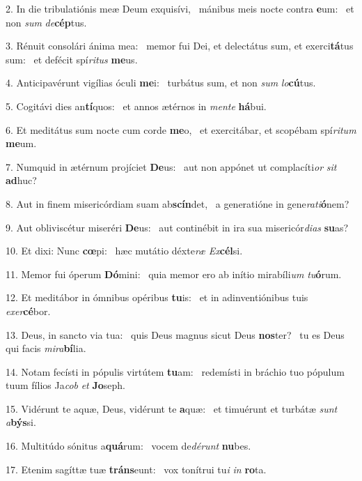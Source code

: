 2. In die tribulatiónis meæ Deum exquisívi, \dag\  mánibus meis nocte contra \textbf{e}um: \ast\  et non \textit{sum} \textit{de}\textbf{cép}tus.\

3. Rénuit consolári ánima mea: \dag\  memor fui Dei, et delectátus sum, et exerci\textbf{tá}tus sum: \ast\  et defécit spí\textit{ri}\textit{tus} \textbf{me}us.\

4. Anticipavérunt vigílias óculi \textbf{me}i: \ast\  turbátus sum, et non \textit{sum} \textit{lo}\textbf{cú}tus.\

5. Cogitávi dies an\textbf{tí}quos: \ast\  et annos ætérnos in \textit{men}\textit{te} \textbf{há}bui.\

6. Et meditátus sum nocte cum corde \textbf{me}o, \ast\  et exercitábar, et scopébam spí\textit{ri}\textit{tum} \textbf{me}um.\

7. Numquid in ætérnum projíciet \textbf{De}us: \ast\  aut non appónet ut complacíti\textit{or} \textit{sit} \textbf{ad}huc?\

8. Aut in finem misericórdiam suam ab\textbf{scín}det, \ast\  a generatióne in gene\textit{ra}\textit{ti}\textbf{ó}nem?\

9. Aut obliviscétur miseréri \textbf{De}us: \ast\  aut continébit in ira sua misericór\textit{di}\textit{as} \textbf{su}as?\

10. Et dixi: Nunc \textbf{cœ}pi: \ast\  hæc mutátio déxte\textit{ræ} \textit{Ex}\textbf{cél}si.\

11. Memor fui óperum \textbf{Dó}mini: \ast\  quia memor ero ab inítio mirabíli\textit{um} \textit{tu}\textbf{ó}rum.\

12. Et meditábor in ómnibus opéribus \textbf{tu}is: \ast\  et in adinventiónibus tuis \textit{ex}\textit{er}\textbf{cé}bor.\

13. Deus, in sancto via tua: \dag\  quis Deus magnus sicut Deus \textbf{nos}ter? \ast\  tu es Deus qui facis \textit{mi}\textit{ra}\textbf{bí}lia.\

14. Notam fecísti in pópulis virtútem \textbf{tu}am: \ast\  redemísti in bráchio tuo pópulum tuum fílios Ja\textit{cob} \textit{et} \textbf{Jo}seph.\

15. Vidérunt te aquæ, Deus, vidérunt te \textbf{a}quæ: \ast\  et timuérunt et turbátæ \textit{sunt} \textit{a}\textbf{býs}si.\

16. Multitúdo sónitus a\textbf{quá}rum: \ast\  vocem de\textit{dé}\textit{runt} \textbf{nu}bes.\

17. Etenim sagíttæ tuæ \textbf{tráns}eunt: \ast\  vox tonítrui tu\textit{i} \textit{in} \textbf{ro}ta.\

